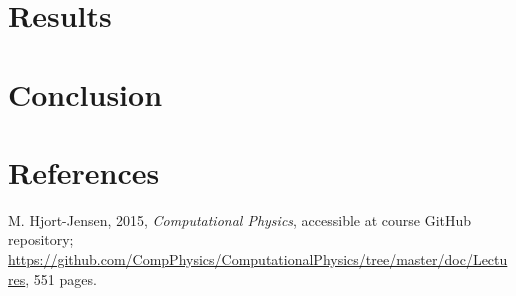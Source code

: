 \documentclass[12pt]{article}
\begin{document}
\section{Results}
\section{Conclusion}
\section{References}
M. Hjort-Jensen, 2015, \textit{Computational Physics}, accessible at course GitHub repository; \url{https://github.com/CompPhysics/ComputationalPhysics/tree/master/doc/Lectures}, 551 pages.
\end{document}
